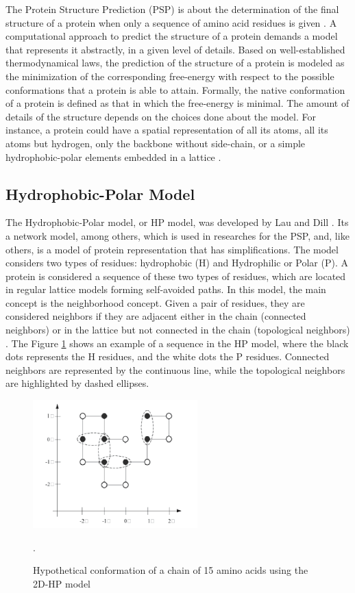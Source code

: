 \documentclass[conference]{IEEEtran}
\begin{document}
The Protein Structure Prediction (PSP) is about the determination of the final structure of a protein when only a sequence of amino acid residues is given \cite{dorn2014three}. A computational approach to predict the structure of a protein demands a model that represents it abstractly, in a given level of details. Based on well-established thermodynamical laws, the prediction of the structure of a protein is modeled as the minimization of the corresponding free-energy with respect to the possible conformations that a protein is able to attain. Formally, the native conformation of a protein is defined as that in which the free-energy is minimal. The amount of details of the structure depends on the choices done about the model. For instance, a protein could have a spatial representation of all its atoms, all its atoms but hydrogen, only the backbone without side-chain, or a simple hydrophobic-polar elements embedded in a lattice \cite{lopes2008evolutionary}.


\subsection{Hydrophobic-Polar Model}

The Hydrophobic-Polar model, or HP model, was developed by Lau and Dill \cite{lau1989lattice}. Its a network model, among others, which is used in researches for the PSP, and, like others, is a model of protein representation that has simplifications. The model considers two types of residues: hydrophobic (H) and Hydrophilic or Polar (P). A protein is considered a sequence of these two types of residues, which are located in regular lattice models forming self-avoided paths. In this model, the main concept is the neighborhood concept. Given a pair of residues, they are considered neighbors if they are adjacent  either in the chain (connected neighbors) or  in the lattice but not connected in the chain (topological neighbors) \cite{santana2008protein}. The Figure \ref{fig1} shows an example of a sequence in the HP model, where the black dots represents the H residues, and the white dots the P residues. Connected neighbors are represented by the continuous line, while the topological neighbors are highlighted by dashed ellipses.

\begin{figure}[ht]
	\centering
	\includegraphics[width=2.5in]{figures/figure1.png}
	\caption{Hypothetical conformation of a chain of 15 amino acids using the 2D-HP model \cite{lopes2008evolutionary}}.
	\label{fig1}
\end{figure}
\end{document}
